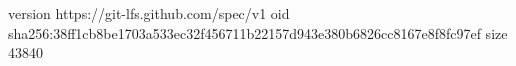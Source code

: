 version https://git-lfs.github.com/spec/v1
oid sha256:38ff1cb8be1703a533ec32f456711b22157d943e380b6826cc8167e8f8fc97ef
size 43840
